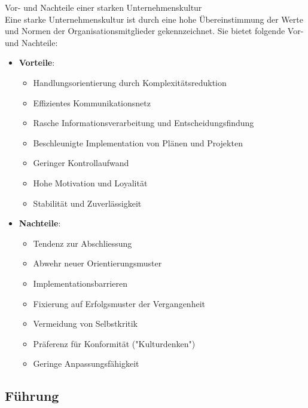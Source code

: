 \begin{concept}{Vor- und Nachteile einer starken Unternehmenskultur}\\
Eine starke Unternehmenskultur ist durch eine hohe Übereinstimmung der Werte und Normen der Organisationsmitglieder gekennzeichnet. Sie bietet folgende Vor- und Nachteile:
\begin{itemize}
    \item \textbf{Vorteile}:
    \begin{itemize}
        \item Handlungsorientierung durch Komplexitätsreduktion
        \item Effizientes Kommunikationsnetz
        \item Rasche Informationsverarbeitung und Entscheidungsfindung
        \item Beschleunigte Implementation von Plänen und Projekten
        \item Geringer Kontrollaufwand
        \item Hohe Motivation und Loyalität
        \item Stabilität und Zuverlässigkeit
    \end{itemize}
    \item \textbf{Nachteile}:
    \begin{itemize}
        \item Tendenz zur Abschliessung
        \item Abwehr neuer Orientierungsmuster
        \item Implementationsbarrieren
        \item Fixierung auf Erfolgsmuster der Vergangenheit
        \item Vermeidung von Selbstkritik
        \item Präferenz für Konformität ("Kulturdenken")
        \item Geringe Anpassungsfähigkeit
    \end{itemize}
\end{itemize}
\end{concept}

\subsection{Führung}

